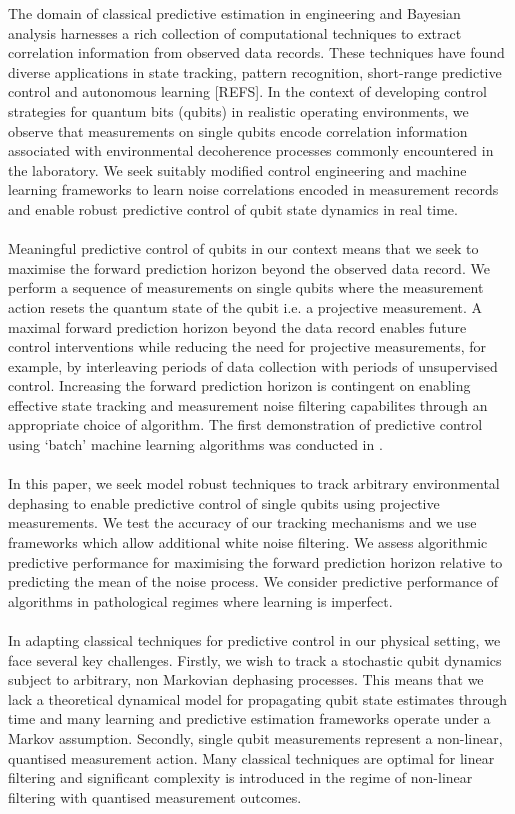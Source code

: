 The domain of classical predictive estimation in engineering and Bayesian analysis harnesses a rich collection of computational techniques to extract correlation information from observed data records. These techniques have found diverse applications in state tracking, pattern recognition, short-range predictive control and autonomous learning [REFS].  In the context of developing control strategies for quantum bits (qubits) in realistic operating environments, we observe that measurements on single qubits encode correlation information associated with environmental decoherence processes commonly encountered in the laboratory. We seek suitably modified control engineering and machine learning frameworks to learn noise correlations encoded in  measurement records and enable robust predictive control of qubit state dynamics in real time.   
\\
\\
Meaningful predictive control of qubits in our context means that we seek to maximise the forward prediction horizon beyond the observed data record. We perform  a sequence of measurements on single qubits where the measurement action resets the quantum state of the qubit i.e. a projective measurement. A maximal forward prediction horizon beyond the data record enables future control interventions while reducing the need for projective measurements, for example, by interleaving periods of data collection with periods of unsupervised control.  Increasing the forward prediction horizon is contingent on enabling effective state tracking and measurement noise filtering capabilites through an appropriate choice of algorithm. The first demonstration of predictive control using `batch' machine learning algorithms was conducted in  \cite{mavadia2017}.
\\
\\
In this paper, we seek model robust techniques to track arbitrary environmental dephasing to enable predictive control of single qubits using projective measurements. We test the accuracy of our tracking mechanisms and we use frameworks which allow additional white noise filtering. We assess algorithmic predictive performance for maximising the forward prediction horizon relative to predicting the mean of the noise process. We consider predictive performance of algorithms in pathological regimes where learning is imperfect. 
\\
\\
In adapting classical techniques for predictive control in our physical setting, we face several key challenges. Firstly, we wish to track a stochastic qubit dynamics subject to arbitrary, non Markovian dephasing processes. This means that we lack a theoretical dynamical model for propagating qubit state estimates through time and many learning and predictive estimation frameworks operate under a Markov assumption. Secondly, single qubit measurements represent a non-linear, quantised measurement action.  Many classical techniques are optimal for linear filtering and significant complexity is introduced in the regime of non-linear filtering with quantised measurement outcomes. 

